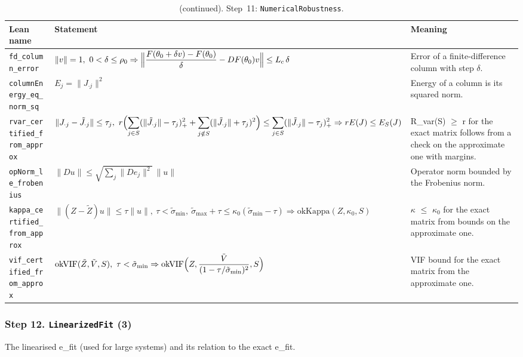 \addtocounter{table}{-1}
{\small
\begin{longtable}{@{}>{\raggedright\arraybackslash}p{3.6cm}>{\raggedright\arraybackslash}p{6.6cm}>{\raggedright\arraybackslash}p{5.6cm}@{}}
\caption[]{(continued). Step~11: \texttt{NumericalRobustness}.}\\
\toprule
Lean name & Statement & Meaning \\
\midrule
\endhead
\texttt{fd\_\allowbreak{}column\_\allowbreak{}error} & $\displaystyle \|v\|=1,\ 0<\delta\le\rho_0\Rightarrow\Bigl\|\dfrac{F(\theta_0+\delta v)-F(\theta_0)}{\delta}-DF(\theta_0)v\Bigr\|\le L_c\,\delta$ & Error of a finite-difference column with step $\delta$. \\[3pt]
\texttt{columnEnergy\_\allowbreak{}eq\_\allowbreak{}norm\_\allowbreak{}sq} & $\displaystyle E_j=\|J_{\cdot j}\|^2$ & Energy of a column is its squared norm. \\[3pt]
\texttt{rvar\_\allowbreak{}certified\_\allowbreak{}from\_\allowbreak{}approx} & $\displaystyle \|J_{\cdot j}-\tilde J_{\cdot j}\|\le\tau_j,\ r\Bigl(\sum_{j\in S}(\|\tilde J_{\cdot j}\|-\tau_j)_+^2+\sum_{j\notin S}(\|\tilde J_{\cdot j}\|+\tau_j)^2\Bigr)\le\sum_{j\in S}(\|\tilde J_{\cdot j}\|-\tau_j)_+^2\Rightarrow rE(J)\le E_S(J)$ & R\_var(S) $\ge$ r for the exact matrix follows from a check on the approximate one with margins. \\[3pt]
\texttt{opNorm\_\allowbreak{}le\_\allowbreak{}frobenius} & $\displaystyle \|Du\|\le\sqrt{\textstyle\sum_j\|De_j\|^2}\,\|u\|$ & Operator norm bounded by the Frobenius norm. \\[3pt]
\texttt{kappa\_\allowbreak{}certified\_\allowbreak{}from\_\allowbreak{}approx} & $\displaystyle \|(Z-\tilde Z)u\|\le\tau\|u\|,\ \tau<\tilde\sigma_{\min},\ \tilde\sigma_{\max}+\tau\le\kappa_0(\tilde\sigma_{\min}-\tau)\Rightarrow\mathrm{okKappa}(Z,\kappa_0,S)$ & $\kappa$ $\le$ $\kappa_0$ for the exact matrix from bounds on the approximate one. \\[3pt]
\texttt{vif\_\allowbreak{}certified\_\allowbreak{}from\_\allowbreak{}approx} & $\displaystyle \mathrm{okVIF}(\tilde Z,\tilde V,S),\ \tau<\tilde\sigma_{\min}\Rightarrow\mathrm{okVIF}\Bigl(Z,\dfrac{\tilde V}{(1-\tau/\tilde\sigma_{\min})^2},S\Bigr)$ & VIF bound for the exact matrix from the approximate one. \\[3pt]
\bottomrule
\end{longtable}
}

\subsubsection*{Step 12. \texttt{LinearizedFit} (3)}
The linearised e\_fit (used for large systems) and its relation to the exact e\_fit.

